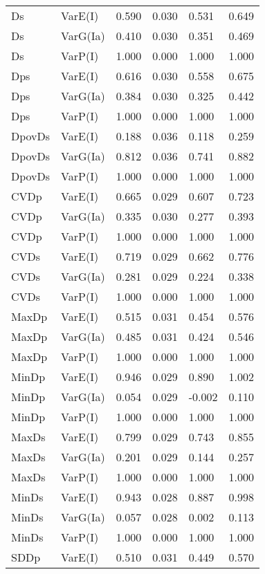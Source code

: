 \begin{center}
\begin{longtable}{|p{0.6in}|p{0.7in}|p{0.6in}|p{0.6in}|p{0.6in}|p{0.6in}|}
  Ds & VarE(I) & 0.590 & 0.030 & 0.531 & 0.649 \\ 
  Ds & VarG(Ia) & 0.410 & 0.030 & 0.351 & 0.469 \\ 
  Ds & VarP(I) & 1.000 & 0.000 & 1.000 & 1.000 \\ 
  Dps & VarE(I) & 0.616 & 0.030 & 0.558 & 0.675 \\ 
  Dps & VarG(Ia) & 0.384 & 0.030 & 0.325 & 0.442 \\ 
  Dps & VarP(I) & 1.000 & 0.000 & 1.000 & 1.000 \\ 
  DpovDs & VarE(I) & 0.188 & 0.036 & 0.118 & 0.259 \\ 
  DpovDs & VarG(Ia) & 0.812 & 0.036 & 0.741 & 0.882 \\ 
  DpovDs & VarP(I) & 1.000 & 0.000 & 1.000 & 1.000 \\ 
  CVDp & VarE(I) & 0.665 & 0.029 & 0.607 & 0.723 \\ 
  CVDp & VarG(Ia) & 0.335 & 0.030 & 0.277 & 0.393 \\ 
  CVDp & VarP(I) & 1.000 & 0.000 & 1.000 & 1.000 \\ 
  CVDs & VarE(I) & 0.719 & 0.029 & 0.662 & 0.776 \\ 
  CVDs & VarG(Ia) & 0.281 & 0.029 & 0.224 & 0.338 \\ 
  CVDs & VarP(I) & 1.000 & 0.000 & 1.000 & 1.000 \\ 
  MaxDp & VarE(I) & 0.515 & 0.031 & 0.454 & 0.576 \\ 
  MaxDp & VarG(Ia) & 0.485 & 0.031 & 0.424 & 0.546 \\ 
  MaxDp & VarP(I) & 1.000 & 0.000 & 1.000 & 1.000 \\ 
  MinDp & VarE(I) & 0.946 & 0.029 & 0.890 & 1.002 \\ 
  MinDp & VarG(Ia) & 0.054 & 0.029 & -0.002 & 0.110 \\ 
  MinDp & VarP(I) & 1.000 & 0.000 & 1.000 & 1.000 \\ 
  MaxDs & VarE(I) & 0.799 & 0.029 & 0.743 & 0.855 \\ 
  MaxDs & VarG(Ia) & 0.201 & 0.029 & 0.144 & 0.257 \\ 
  MaxDs & VarP(I) & 1.000 & 0.000 & 1.000 & 1.000 \\ 
  MinDs & VarE(I) & 0.943 & 0.028 & 0.887 & 0.998 \\ 
  MinDs & VarG(Ia) & 0.057 & 0.028 & 0.002 & 0.113 \\ 
  MinDs & VarP(I) & 1.000 & 0.000 & 1.000 & 1.000 \\ 
  SDDp & VarE(I) & 0.510 & 0.031 & 0.449 & 0.570 \\ 

\end{longtable}
\end{center}
